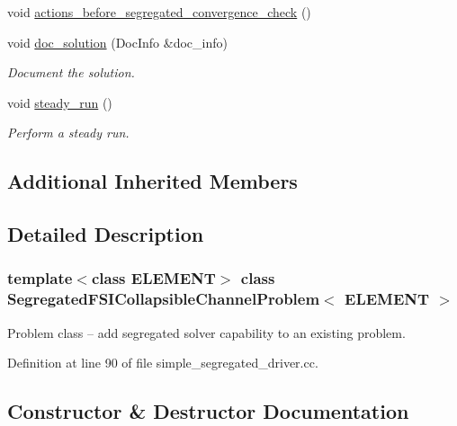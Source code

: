 \begin{DoxyCompactItemize}
void \hyperlink{classSegregatedFSICollapsibleChannelProblem_a8ee14a1d4ab159c9b28dfcb177dc7c57}{actions\+\_\+before\+\_\+segregated\+\_\+convergence\+\_\+check} ()
\item 
void \hyperlink{classSegregatedFSICollapsibleChannelProblem_a0f7364ea880f2e740e1960830246e028}{doc\+\_\+solution} (Doc\+Info \&doc\+\_\+info)
\begin{DoxyCompactList}\small\item\em Document the solution. \end{DoxyCompactList}\item 
void \hyperlink{classSegregatedFSICollapsibleChannelProblem_a9a6b0dfeda9eb0d4c50e195768c93e37}{steady\+\_\+run} ()
\begin{DoxyCompactList}\small\item\em Perform a steady run. \end{DoxyCompactList}\end{DoxyCompactItemize}
\subsection*{Additional Inherited Members}


\subsection{Detailed Description}
\subsubsection*{template$<$class E\+L\+E\+M\+E\+NT$>$\newline
class Segregated\+F\+S\+I\+Collapsible\+Channel\+Problem$<$ E\+L\+E\+M\+E\+N\+T $>$}

Problem class -- add segregated solver capability to an existing problem. 

Definition at line 90 of file simple\+\_\+segregated\+\_\+driver.\+cc.



\subsection{Constructor \& Destructor Documentation}
\mbox{\label{classSegregatedFSICollapsibleChannelProblem_ac762b472c2baafa23dae6b9ce38f31da}} 
